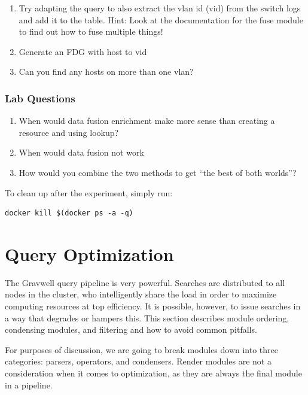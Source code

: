 \begin{enumerate}
\item
  Try adapting the query to also extract the vlan id (vid) from the
  switch logs and add it to the table.
	\subitem Hint: Look at the documentation for the fuse module to find out how to fuse multiple things!
\item
  Generate an FDG with host to vid
\item
  Can you find any hosts on more than one vlan?
\end{enumerate}

\begin{samepage}
\subsubsection{Lab Questions}
\begin{enumerate}
\item
  {When would data fusion enrichment make more sense than creating a
  resource and using lookup?}
\item
  {When would data fusion not work}
\item
  {How would you combine the two methods to get ``the best of both
  worlds''?}
\end{enumerate}
\end{samepage}

To clean up after the experiment, simply run:

\begin{Verbatim}[breaklines=true]
docker kill $(docker ps -a -q)
\end{Verbatim}

\clearpage
\section{Query Optimization}
\label{sec:query-optimization}
The Gravwell query pipeline is very powerful. Searches are distributed
to all nodes in the cluster, who intelligently share the load in order to
maximize computing resources at top efficiency. It is possible, however,
to issue searches in a way that degrades or hampers this.
This section describes module ordering, condensing modules, and filtering
and how to avoid common pitfalls.

For purposes of discussion, we are going to break modules
down into three categories: parsers, operators, and condensers. Render
modules are not a consideration when it comes to optimization, as they
are always the final module in a pipeline.

